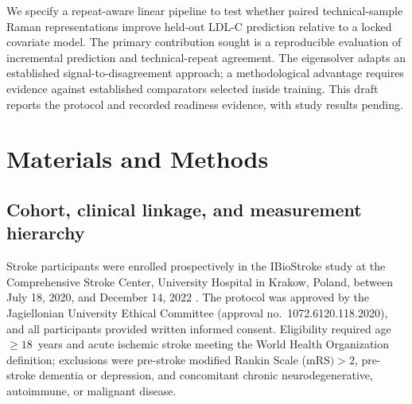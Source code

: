 \documentclass[preprint,12pt]{elsarticle}
\begin{document}
We specify a repeat-aware linear pipeline to test whether paired technical-sample Raman representations improve held-out LDL-C prediction relative to a locked covariate model. The primary contribution sought is a reproducible evaluation of incremental prediction and technical-repeat agreement. The eigensolver adapts an established signal-to-disagreement approach; a methodological advantage requires evidence against established comparators selected inside training. This draft reports the protocol and recorded readiness evidence, with study results pending.

\section{Materials and Methods}
\label{sec:methods}

\subsection{Cohort, clinical linkage, and measurement hierarchy}
\label{subsec:cohort}

Stroke participants were enrolled prospectively in the IBioStroke study at the Comprehensive Stroke Center, University Hospital in Krakow, Poland, between July 18, 2020, and December 14, 2022 \cite{deccwiek2025}. The protocol was approved by the Jagiellonian University Ethical Committee (approval no.\ 1072.6120.118.2020), and all participants provided written informed consent. Eligibility required age $\ge 18$~years and acute ischemic stroke meeting the World Health Organization definition; exclusions were pre-stroke modified Rankin Scale ($\mathrm{mRS}) > 2$, pre-stroke dementia or depression, and concomitant chronic neurodegenerative, autoimmune, or malignant disease.
\end{document}
